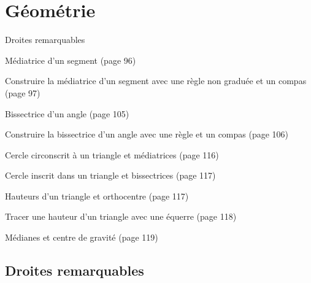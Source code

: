 \documentclass[a4paper,11pt]{report}
\begin{document}
\newcommand{\chapterName}{Géométrie}
\newcommand{\serieName}{Droites remarquables}


\chapter*{\chapterName}
\thispagestyle{empty}

\begin{amL}{\serieName}{
\item Médiatrice d'un segment (page 96)
\item Construire la médiatrice d'un segment avec une règle non graduée et un compas (page 97)
\item Bissectrice d'un angle (page 105)
\item Construire la bissectrice d'un angle avec une règle et un compas (page 106)
\item Cercle circonscrit à un triangle et médiatrices (page 116)
\item Cercle inscrit dans un triangle et bissectrices (page 117)
\item Hauteurs d'un triangle et orthocentre (page 117)
\item Tracer une hauteur d'un triangle avec une équerre (page 118)
\item Médianes et centre de gravité (page 119)
 }
\end{amL}
\section*{\serieName}
\setcounter{page}{1}
\thispagestyle{firstPage}



\end{document}
